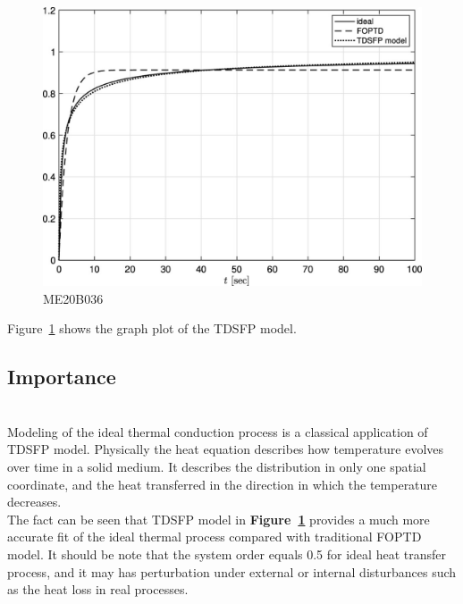 \documentclass[a4paper, 12pt]{article}
\begin{document}
\begin{figure}[h]
    \begin{center}
        \includegraphics[scale=0.4]{Assgt4.eps}
    \end{center}
    \caption{ME20B036}
    \label{f1:image}
\end{figure}


Figure~\ref{f1:image} shows the graph plot of the TDSFP model.~\cite{YUAN2022108111}
\vspace{1cm}

\subsection{Importance}
\vspace{0.5cm}

\\{Modeling of the ideal thermal conduction process is a classical application of TDSFP model. Physically the heat equation describes how temperature evolves over time in a solid medium. It describes the distribution in only one spatial coordinate, and the heat transferred in the direction in which the temperature decreases.~\cite{YUAN2022108111}}
\vspace{0.5cm}
\\{The fact can be seen that TDSFP model in \textbf{Figure~\ref{f1:image}} provides a much more accurate fit of the ideal thermal process compared with traditional FOPTD model. It should be note that the system order equals 0.5 for ideal heat transfer process, and it may has perturbation under external or internal disturbances such as the heat loss in real processes.}


%
%
\end{document}
